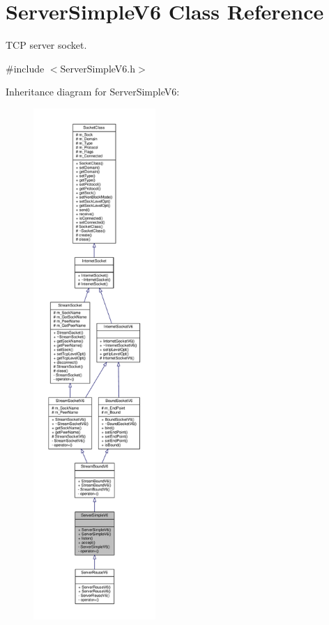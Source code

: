 \hypertarget{classServerSimpleV6}{}\section{Server\+Simple\+V6 Class Reference}
\label{classServerSimpleV6}


T\+CP server socket.  




{\ttfamily \#include $<$Server\+Simple\+V6.\+h$>$}



Inheritance diagram for Server\+Simple\+V6\+:\nopagebreak
\begin{figure}[H]
\begin{center}
\leavevmode
\includegraphics[height=550pt]{classServerSimpleV6__inherit__graph}
\end{center}
\end{figure}
